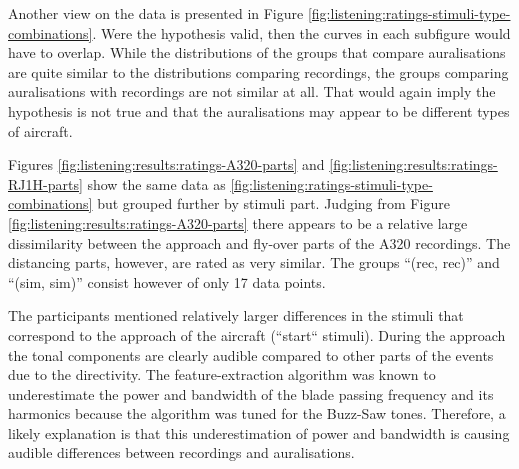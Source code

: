 

Another view on the data is presented in Figure
\ref{fig:listening:ratings-stimuli-type-combinations}. Were the hypothesis
valid, then the curves in each subfigure would have to overlap. While the
distributions of the groups that compare auralisations are quite similar to the
distributions comparing recordings, the groups comparing auralisations with
recordings are not similar at all. That would again imply the hypothesis is not
true and that the auralisations may appear to be different types of aircraft.


Figures \ref{fig:listening:results:ratings-A320-parts} and
\ref{fig:listening:results:ratings-RJ1H-parts} show the same data as
\ref{fig:listening:ratings-stimuli-type-combinations} but grouped further by
stimuli part. Judging from Figure \ref{fig:listening:results:ratings-A320-parts}
there appears to be a relative large dissimilarity between the approach and
fly-over parts of the A320 recordings. The distancing parts, however, are rated
as very similar. The groups ``(rec, rec)'' and ``(sim, sim)'' consist however of
only 17 data points.


The participants mentioned relatively larger differences in the stimuli that
correspond to the approach of the aircraft (``start`` stimuli). During the
approach the tonal components are clearly audible compared to other parts of the
events due to the directivity. The feature-extraction algorithm was known to
underestimate the power and bandwidth of the blade passing frequency and its
harmonics because the algorithm was tuned for the Buzz-Saw tones. Therefore, a
likely explanation is that this underestimation of power and bandwidth is
causing audible differences between recordings and auralisations.

